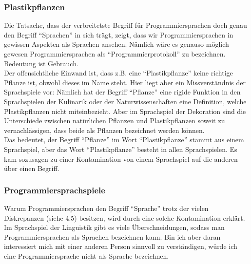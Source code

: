 \documentclass[10pt,a4paper]{article}
\begin{document}
\subsubsection{Plastikpflanzen}
Die Tatsache, dass der verbreitetste Begriff für Programmiersprachen doch genau den Begriff \enquote{Sprachen} in sich trägt, zeigt, dass wir Programmiersprachen in gewissen Aspekten als Sprachen ansehen. Nämlich wäre es genauso möglich gewesen Programmiersprachen als \enquote{Programmierprotokoll} zu bezeichnen. Bedeutung ist Gebrauch. \\
Der offensichtliche Einwand ist, dass z.B. eine \enquote{Plastikpflanze} keine richtige Pflanze ist, obwohl dieses im Name steht. Hier liegt aber ein Missverständnis der Sprachspiele vor: Nämlich hat der Begriff \enquote{Pflanze} eine rigide Funktion in den Sprachspielen der Kulinarik oder der Naturwissenschaften eine Definition, welche Plastikpflanzen nicht miteinbezieht. Aber im Sprachspiel der Dekoration sind die Unterschiede zwischen natürlichen Pflanzen und Plastikpflanzen soweit zu vernachlässigen, dass beide als Pflanzen bezeichnet werden können. \\
Das bedeutet, der Begriff \enquote{Pflanze} im Wort \enquote{Plastikpflanze} stammt aus einem Sprachspiel, aber das Wort \enquote{Plastikpflanze} besteht in allen Sprachspielen. Es kam sozusagen zu einer Kontamination von einem Sprachspiel auf die anderen über einen Begriff.

\subsubsection{Programmiersprachspiele}
Warum Programmiersprachen den Begriff \enquote{Sprache} trotz der vielen Diskrepanzen (siehe 4.5) besitzen, wird durch eine solche Kontamination erklärt. Im Sprachspiel der Linguistik gibt es viele Überschneidungen, sodass man Programmiersprachen als Sprachen bezeichnen kann. Bin ich aber daran interessiert mich mit einer anderen Person sinnvoll zu verständigen, würde ich eine Programmiersprache nicht als Sprache bezeichnen.
\end{document}
